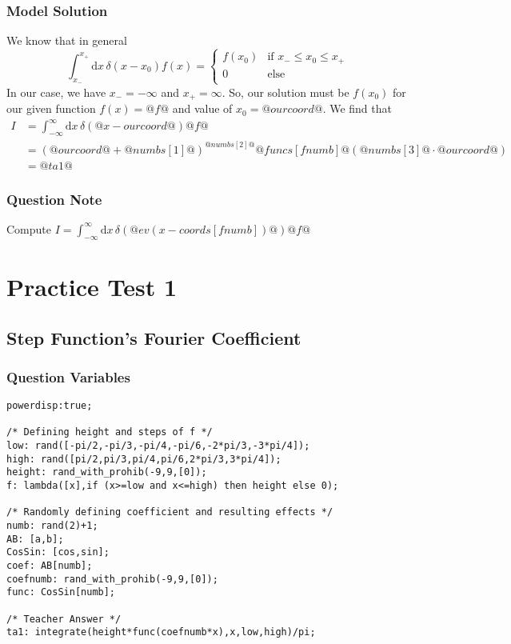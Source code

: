\documentclass[a4paper,10pt]{article}
\begin{document}
\subsubsection{Model Solution}
We know that in general \[ \int_{x_{-}}^{x_{+}} \text{d}x \, \delta\left(x-x_0\right)f(x) = \begin{cases} f(x_0) & \text{if } x_{-}\leq x_{0} \leq x_{+} \\ 0 & \text{else} \\ \end{cases} \] In our case, we have \(x_{-}=-\infty\) and \(x_{+}=\infty\). So, our solution must be \(f(x_0)\) for our given function \(f(x)=@f@\) and value of \(x_0=@ourcoord@\). We find that \begin{align*} I &= \int_{-\infty}^{\infty} \text{d}x \, \delta\left(@x-ourcoord@\right)@f@ \\ &= \left(@ourcoord@ + @numbs[1]@\right)^{@numbs[2]@} @funcs[fnumb]@\left(@numbs[3]@\cdot@ourcoord@ \right) \\ &= @ta1@ \end{align*}
\subsubsection{Question Note}
Compute $I = \int_{-\infty}^{\infty} \text{d}x \, \delta\left(@ev(x-coords[fnumb])@\right)@f@$

\section{Practice Test 1}
\subsection{Step Function's Fourier Coefficient}
\subsubsection{Question Variables}
\begin{lstlisting}
powerdisp:true;

/* Defining height and steps of f */
low: rand([-pi/2,-pi/3,-pi/4,-pi/6,-2*pi/3,-3*pi/4]);
high: rand([pi/2,pi/3,pi/4,pi/6,2*pi/3,3*pi/4]);
height: rand_with_prohib(-9,9,[0]);
f: lambda([x],if (x>=low and x<=high) then height else 0);

/* Randomly defining coefficient and resulting effects */
numb: rand(2)+1;
AB: [a,b];
CosSin: [cos,sin];
coef: AB[numb];
coefnumb: rand_with_prohib(-9,9,[0]);
func: CosSin[numb];

/* Teacher Answer */
ta1: integrate(height*func(coefnumb*x),x,low,high)/pi;
\end{lstlisting}
\end{document}
